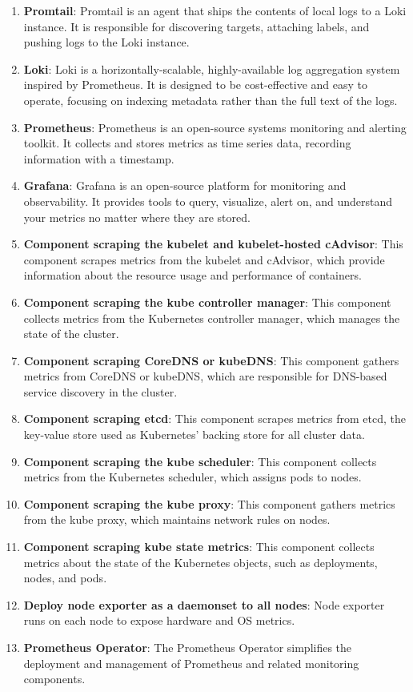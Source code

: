 \begin{enumerate}
    \item \textbf{Promtail}: Promtail is an agent that ships the contents of local logs to a Loki instance. It is responsible for discovering targets, attaching labels, and pushing logs to the Loki instance.
    \item \textbf{Loki}: Loki is a horizontally-scalable, highly-available log aggregation system inspired by Prometheus. It is designed to be cost-effective and easy to operate, focusing on indexing metadata rather than the full text of the logs.
    \item \textbf{Prometheus}: Prometheus is an open-source systems monitoring and alerting toolkit. It collects and stores metrics as time series data, recording information with a timestamp.
    \item \textbf{Grafana}: Grafana is an open-source platform for monitoring and observability. It provides tools to query, visualize, alert on, and understand your metrics no matter where they are stored.
    \item \textbf{Component scraping the kubelet and kubelet-hosted cAdvisor}: This component scrapes metrics from the kubelet and cAdvisor, which provide information about the resource usage and performance of containers.
    \item \textbf{Component scraping the kube controller manager}: This component collects metrics from the Kubernetes controller manager, which manages the state of the cluster.
    \item \textbf{Component scraping CoreDNS or kubeDNS}: This component gathers metrics from CoreDNS or kubeDNS, which are responsible for DNS-based service discovery in the cluster.
    \item \textbf{Component scraping etcd}: This component scrapes metrics from etcd, the key-value store used as Kubernetes' backing store for all cluster data.
    \item \textbf{Component scraping the kube scheduler}: This component collects metrics from the Kubernetes scheduler, which assigns pods to nodes.
    \item \textbf{Component scraping the kube proxy}: This component gathers metrics from the kube proxy, which maintains network rules on nodes.
    \item \textbf{Component scraping kube state metrics}: This component collects metrics about the state of the Kubernetes objects, such as deployments, nodes, and pods.
    \item \textbf{Deploy node exporter as a daemonset to all nodes}: Node exporter runs on each node to expose hardware and OS metrics.
    \item \textbf{Prometheus Operator}: The Prometheus Operator simplifies the deployment and management of Prometheus and related monitoring components.
\end{enumerate}

